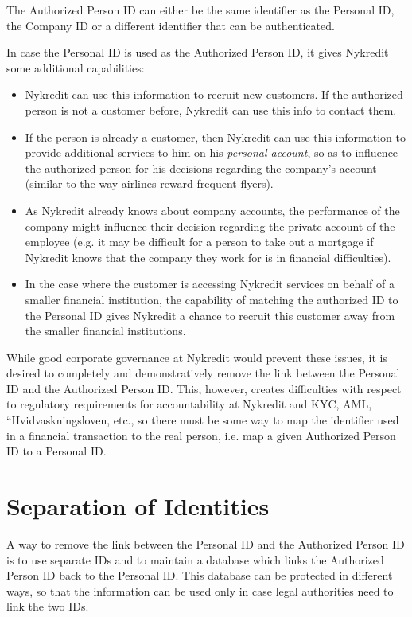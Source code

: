 The Authorized Person ID can either be the same identifier as the Personal ID, the Company ID or a different identifier that can be authenticated. 

In case the Personal ID is used as the Authorized Person ID, it gives Nykredit some additional capabilities:
\begin{itemize}
\item Nykredit can use this information to recruit new customers. If the authorized person is not a customer before, Nykredit can use this info to contact them.
\item If the person is already a customer, then Nykredit can use this information to provide additional services to him on his \textit{personal account}, so as to influence the authorized person for his decisions regarding the company's account (similar to the way airlines reward frequent flyers).
\item As Nykredit already knows about company accounts, the performance of the company might influence their decision regarding the private account of the employee (e.g. it may be difficult for a person to take out a mortgage if Nykredit knows that the company they work for is in financial difficulties).
\item In the case where the customer is accessing Nykredit services on behalf of a smaller financial institution, the capability of matching the authorized ID to the Personal ID gives Nykredit a chance to recruit this customer away from the smaller financial institutions.
\end{itemize}
While good corporate governance at Nykredit would prevent these issues, it is desired to completely and demonstratively remove the link between the Personal ID and the Authorized Person ID. This, however, creates difficulties with respect to regulatory requirements for accountability at Nykredit and KYC, AML, “Hvidvaskningsloven, etc., so there must be some way to map the identifier used in a financial transaction to the real person, i.e. map a given Authorized Person ID to a Personal ID.

\section{Separation of Identities}
A way to remove the link between the Personal ID and the Authorized Person ID is to use separate IDs and to maintain a database which links the Authorized Person ID back to the Personal ID. This database can be protected in different ways, so that the information can be used only in case legal authorities need to link the two IDs.

